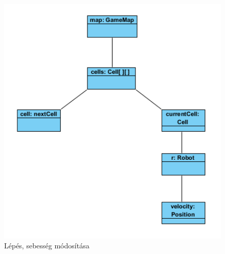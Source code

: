 \begin{figure}[!htbp]
	\begin{center}
		\includegraphics[width=13cm]{./chapters/chapter05/stepobject.png}
		\caption{Lépés, sebesség módosítása}
	\end{center}
\end{figure}
